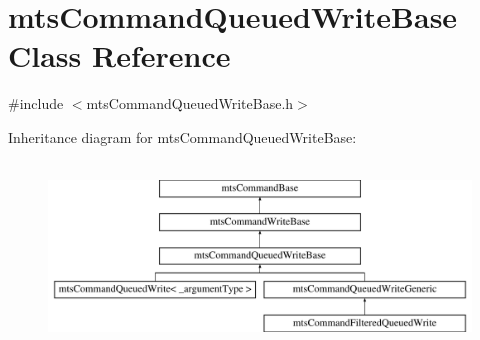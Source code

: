 \hypertarget{classmts_command_queued_write_base}{\section{mts\-Command\-Queued\-Write\-Base Class Reference}
\label{classmts_command_queued_write_base}
}


{\ttfamily \#include $<$mts\-Command\-Queued\-Write\-Base.\-h$>$}

Inheritance diagram for mts\-Command\-Queued\-Write\-Base\-:\begin{figure}[H]
\begin{center}
\leavevmode
\includegraphics[height=5.000000cm]{d9/d66/classmts_command_queued_write_base}
\end{center}
\end{figure}
